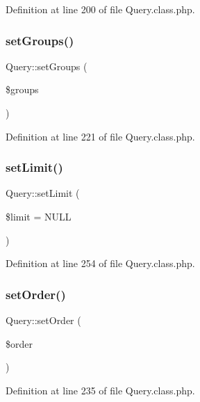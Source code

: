 Definition at line 200 of file Query.\+class.\+php.

\hypertarget{classQuery_ab32d5ecb27ebf9facac7ba9c28fc22f6}{}\label{classQuery_ab32d5ecb27ebf9facac7ba9c28fc22f6} 
\subsubsection{\texorpdfstring{set\+Groups()}{setGroups()}}
{\footnotesize\ttfamily Query\+::set\+Groups (\begin{DoxyParamCaption}\item[{}]{\$groups }\end{DoxyParamCaption})}



Definition at line 221 of file Query.\+class.\+php.

\hypertarget{classQuery_a16a55fd5666868a39a7a93f7b98d4de0}{}\label{classQuery_a16a55fd5666868a39a7a93f7b98d4de0} 
\subsubsection{\texorpdfstring{set\+Limit()}{setLimit()}}
{\footnotesize\ttfamily Query\+::set\+Limit (\begin{DoxyParamCaption}\item[{}]{\$limit = {\ttfamily NULL} }\end{DoxyParamCaption})}



Definition at line 254 of file Query.\+class.\+php.

\hypertarget{classQuery_a712d4ae76fa0efafa198d2e1fe23a222}{}\label{classQuery_a712d4ae76fa0efafa198d2e1fe23a222} 
\subsubsection{\texorpdfstring{set\+Order()}{setOrder()}}
{\footnotesize\ttfamily Query\+::set\+Order (\begin{DoxyParamCaption}\item[{}]{\$order }\end{DoxyParamCaption})}



Definition at line 235 of file Query.\+class.\+php.

